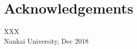
\chapter*{Acknowledgements}


\bigskip

\begin{flushright}
XXX \\
Nankai University, Dec 2018
\end{flushright}

